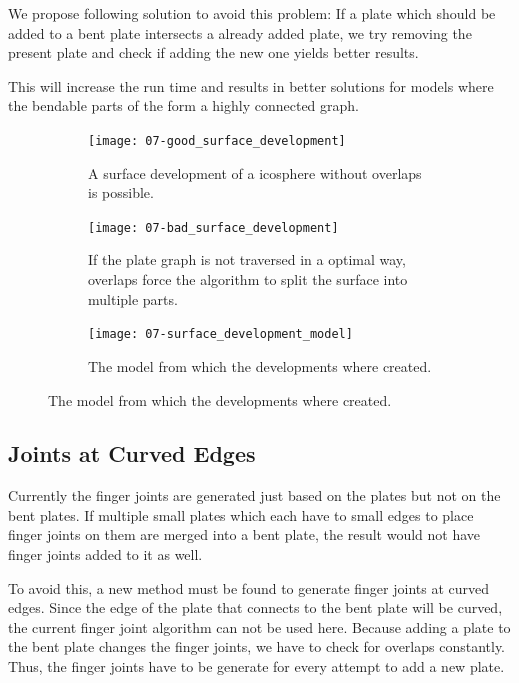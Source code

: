 \documentclass[../ClassicThesis.tex]{subfiles}
\begin{document}
We propose following solution to avoid this problem: If a plate which should be added to a bent plate intersects a already added plate, we try removing the present plate and check if adding the new one yields better results.

This will increase the run time and results in better solutions for models where the bendable parts of the \threedmodel{} form a highly connected graph.

\begin{figure}[h]
  \centering
  \begin{subfigure}[b]{0.75\textwidth}
    \centering
    \texttt{[image: 07-good\_surface\_development]}
    \caption{A surface development of a icosphere without overlaps is possible.}
    \label{fig:overlaps:no-3d}
  \end{subfigure}
  \begin{subfigure}[b]{0.75\textwidth}
    \centering
    \texttt{[image: 07-bad\_surface\_development]}
    \caption{If the plate graph is not traversed in a optimal way, overlaps force the algorithm to split the surface into multiple parts.}
    \label{fig:overlapsh:no-2d}
  \end{subfigure}
  \begin{subfigure}[b]{0.75\textwidth}
    \centering
    \texttt{[image: 07-surface\_development\_model]}
    \caption{The model from which the developments where created.}
    \label{fig:overlapsh:no-2d}
  \end{subfigure}
  \caption{The model from which the developments where created.}
  \label{fig:better_surface_development}
\end{figure}

\subsection{Joints at Curved Edges}

Currently the finger joints are generated just based on the plates but not on the bent plates. If multiple small plates which each have to small edges to place finger joints on them are merged into a bent plate, the result would not have finger joints added to it as well.

To avoid this, a new method must be found to generate finger joints at curved edges. Since the edge of the plate that connects to the bent plate  will be curved, the current finger joint algorithm can not be used here. Because adding a plate to the bent plate changes the finger joints, we have to check for overlaps constantly. Thus, the finger joints have to be generate for every attempt to add a new plate.
\end{document}
